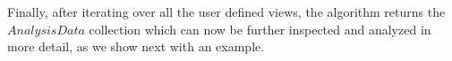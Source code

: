 Finally, after iterating over all the user defined views, the algorithm returns the $AnalysisData$ collection which can now be further inspected and analyzed in more detail, as we show next with an example.

%



%
%

